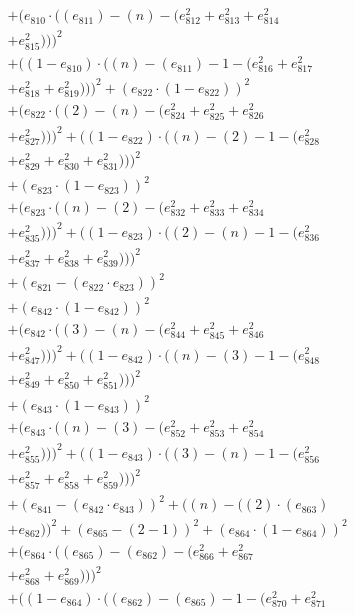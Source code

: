 \documentclass[10pt, a4paper]{article}
\begin{document}
\begin{small}
\begin{align*}
& + (e_{810}  \cdot  ((e_{811}) - (n) - (e_{812}^{2} + e_{813}^{2} + e_{814}^{2} \\
& + e_{815}^{2})))^{2} \\
& + ((1 - e_{810})  \cdot  ((n) - (e_{811}) - 1 - (e_{816}^{2} + e_{817}^{2} \\
& + e_{818}^{2} + e_{819}^{2})))^{2} + (e_{822}  \cdot  (1 - e_{822}))^{2} \\
& + (e_{822}  \cdot  ((2) - (n) - (e_{824}^{2} + e_{825}^{2} + e_{826}^{2} \\
& + e_{827}^{2})))^{2} + ((1 - e_{822})  \cdot  ((n) - (2) - 1 - (e_{828}^{2} \\
& + e_{829}^{2} + e_{830}^{2} + e_{831}^{2})))^{2} \\
& + (e_{823}  \cdot  (1 - e_{823}))^{2} \\
& + (e_{823}  \cdot  ((n) - (2) - (e_{832}^{2} + e_{833}^{2} + e_{834}^{2} \\
& + e_{835}^{2})))^{2} + ((1 - e_{823})  \cdot  ((2) - (n) - 1 - (e_{836}^{2} \\
& + e_{837}^{2} + e_{838}^{2} + e_{839}^{2})))^{2} \\
& + (e_{821} - (e_{822}  \cdot  e_{823}))^{2} \\
& + (e_{842}  \cdot  (1 - e_{842}))^{2} \\
& + (e_{842}  \cdot  ((3) - (n) - (e_{844}^{2} + e_{845}^{2} + e_{846}^{2} \\
& + e_{847}^{2})))^{2} + ((1 - e_{842})  \cdot  ((n) - (3) - 1 - (e_{848}^{2} \\
& + e_{849}^{2} + e_{850}^{2} + e_{851}^{2})))^{2} \\
& + (e_{843}  \cdot  (1 - e_{843}))^{2} \\
& + (e_{843}  \cdot  ((n) - (3) - (e_{852}^{2} + e_{853}^{2} + e_{854}^{2} \\
& + e_{855}^{2})))^{2} + ((1 - e_{843})  \cdot  ((3) - (n) - 1 - (e_{856}^{2} \\
& + e_{857}^{2} + e_{858}^{2} + e_{859}^{2})))^{2} \\
& + (e_{841} - (e_{842}  \cdot  e_{843}))^{2} + ((n) - ((2)  \cdot  (e_{863}) \\
& + e_{862}))^{2} + (e_{865} - (2 - 1))^{2} + (e_{864}  \cdot  (1 - e_{864}))^{2} \\
& + (e_{864}  \cdot  ((e_{865}) - (e_{862}) - (e_{866}^{2} + e_{867}^{2} \\
& + e_{868}^{2} + e_{869}^{2})))^{2} \\
& + ((1 - e_{864})  \cdot  ((e_{862}) - (e_{865}) - 1 - (e_{870}^{2} + e_{871}^{2} \\

\end{align*}
\end{small}
\end{document}

